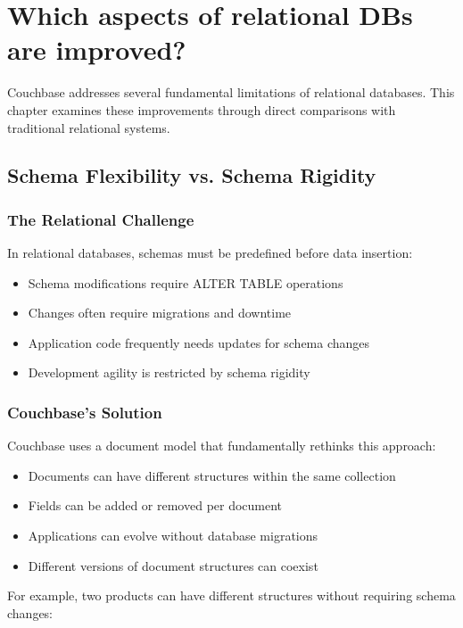 \chapter{Which aspects of relational DBs are improved?}

Couchbase addresses several fundamental limitations of relational databases. This chapter examines these improvements through direct comparisons with traditional relational systems.

\section{Schema Flexibility vs. Schema Rigidity}

\subsection{The Relational Challenge}
In relational databases, schemas must be predefined before data insertion:

\begin{itemize}
  \item Schema modifications require ALTER TABLE operations
  \item Changes often require migrations and downtime
  \item Application code frequently needs updates for schema changes
  \item Development agility is restricted by schema rigidity
\end{itemize}

\subsection{Couchbase's Solution}
Couchbase uses a document model that fundamentally rethinks this approach:

\begin{itemize}
  \item Documents can have different structures within the same collection
  \item Fields can be added or removed per document
  \item Applications can evolve without database migrations
  \item Different versions of document structures can coexist
\end{itemize}

For example, two products can have different structures without requiring schema changes:

